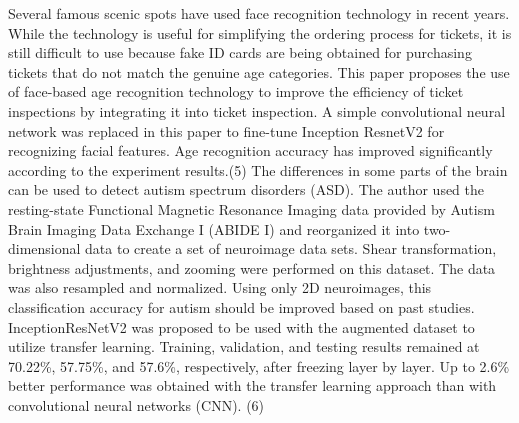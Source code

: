 \documentclass[conference]{IEEEtran}
\begin{document}
Several famous scenic spots have used face recognition technology in recent years. While the technology is useful for simplifying the ordering process for tickets, it is still difficult to use because fake ID cards are being obtained for purchasing tickets that do not match the genuine age categories. This paper proposes the use of face-based age recognition technology to improve the efficiency of ticket inspections by integrating it into ticket inspection. A simple convolutional neural network was replaced in this paper to fine-tune Inception ResnetV2 for recognizing facial features. Age recognition accuracy has improved significantly according to the experiment results.(5) The differences in some parts of the brain can be used to detect autism spectrum disorders (ASD). The author used the resting-state Functional Magnetic Resonance Imaging data provided by Autism Brain Imaging Data Exchange I (ABIDE I) and reorganized it into two-dimensional data to create a set of neuroimage data sets. Shear transformation, brightness adjustments, and zooming were performed on this dataset. The data was also resampled and normalized. Using only 2D neuroimages, this classification accuracy for autism should be improved based on past studies. InceptionResNetV2 was proposed to be used with the augmented dataset to utilize transfer learning. Training, validation, and testing results remained at 70.22\%, 57.75\%, and 57.6\%, respectively, after freezing layer by layer. Up to 2.6\% better performance was obtained with the transfer learning approach than with convolutional neural networks (CNN). (6)  
\end{document}
